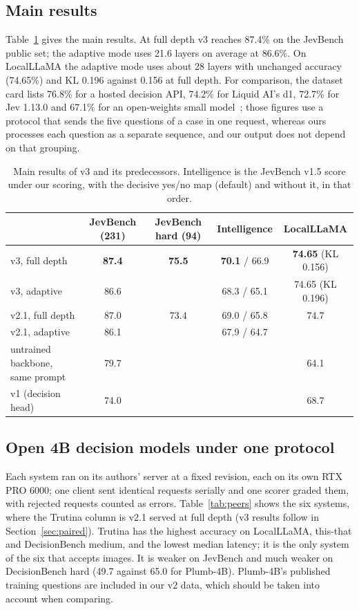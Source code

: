 \documentclass[10pt]{article}
\begin{document}
\subsection{Main results}

Table~\ref{tab:main} gives the main results.
At full depth v3 reaches 87.4\% on the JevBench public set; the adaptive mode uses 21.6 layers on average at 86.6\%.
On LocalLLaMA the adaptive mode uses about 28 layers with unchanged accuracy (74.65\%) and KL 0.196 against 0.156 at full depth.
For comparison, the dataset card lists 76.8\% for a hosted decision API, 74.2\% for Liquid AI's d1, 72.7\% for Jev 1.13.0 and 67.1\% for an open-weights small model~\cite{localllama,d1,jev}; those figures use a protocol that sends the five questions of a case in one request, whereas ours processes each question as a separate sequence, and our output does not depend on that grouping.

\begin{table}[t]
\centering\small
\caption{Main results of v3 and its predecessors. Intelligence is the JevBench v1.5 score under our scoring, with the decisive yes/no map (default) and without it, in that order.}
\label{tab:main}
\begin{tabular}{lcccc}
\toprule
 & JevBench (231) & JevBench hard (94) & Intelligence & LocalLLaMA \\
\midrule
v3, full depth & \textbf{87.4} & \textbf{75.5} & \textbf{70.1} / 66.9 & \textbf{74.65} (KL 0.156) \\
v3, adaptive & 86.6 & & 68.3 / 65.1 & 74.65 (KL 0.196) \\
v2.1, full depth & 87.0 & 73.4 & 69.0 / 65.8 & 74.7 \\
v2.1, adaptive & 86.1 & & 67.9 / 64.7 & \\
untrained backbone, same prompt & 79.7 & & & 64.1 \\
v1 (decision head) & 74.0 & & & 68.7 \\
\bottomrule
\end{tabular}
\end{table}

\subsection{Open 4B decision models under one protocol}

Each system ran on its authors' server at a fixed revision, each on its own RTX PRO 6000; one client sent identical requests serially and one scorer graded them, with rejected requests counted as errors.
Table~\ref{tab:peers} shows the six systems, where the Trutina column is v2.1 served at full depth (v3 results follow in Section~\ref{sec:paired}).
Trutina has the highest accuracy on LocalLLaMA, this-that and DecisionBench medium, and the lowest median latency; it is the only system of the six that accepts images.
It is weaker on JevBench and much weaker on DecisionBench hard (49.7 against 65.0 for Plumb-4B).
Plumb-4B's published training questions are included in our v2 data, which should be taken into account when comparing.
\end{document}
